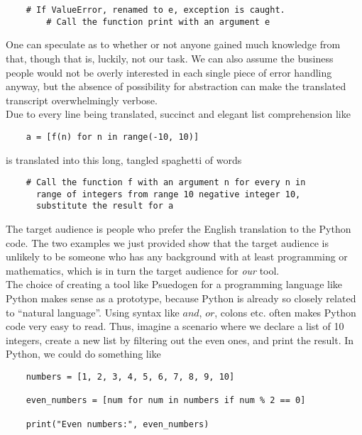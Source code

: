 \begin{verbatim}
    # If ValueError, renamed to e, exception is caught.
        # Call the function print with an argument e
\end{verbatim}

One can speculate as to whether or not anyone gained much knowledge from that, though that is, luckily, not our task. We can also assume the business people would not be overly interested in each single piece of error handling anyway, but the absence of possibility for abstraction can make the translated transcript overwhelmingly verbose. \hfill \\

Due to every line being translated, succinct and elegant list comprehension like

\begin{verbatim}
    a = [f(n) for n in range(-10, 10)]
\end{verbatim}

is translated into this long, tangled spaghetti of words

\begin{verbatim}
    # Call the function f with an argument n for every n in
      range of integers from range 10 negative integer 10,
      substitute the result for a
\end{verbatim}

The target audience is people who prefer the English translation to the Python code. The two examples we just provided show that the target audience is unlikely to be someone who has any background with at least programming or mathematics, which is in turn the target audience for \textit{our} tool. \hfill \\

The choice of creating a tool like Psuedogen for a programming language like Python makes sense as a prototype, because Python is already so closely related to ``natural language''. Using syntax like $and$, $or$, colons etc. often makes Python code very easy to read. Thus, imagine a scenario where we declare a list of 10 integers, create a new list by filtering out the even ones, and print the result. In Python, we could do something like

\begin{verbatim}
    numbers = [1, 2, 3, 4, 5, 6, 7, 8, 9, 10]

    even_numbers = [num for num in numbers if num % 2 == 0]

    print("Even numbers:", even_numbers)
\end{verbatim}

